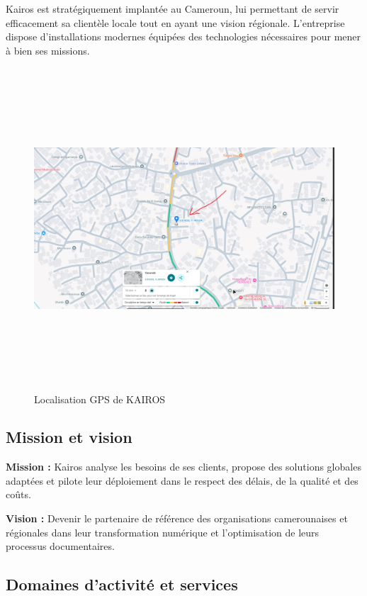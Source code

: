     Kairos est stratégiquement implantée au Cameroun, lui permettant de servir efficacement sa clientèle locale tout en ayant une vision régionale. L'entreprise dispose d'installations modernes équipées des technologies nécessaires pour mener à bien ses missions.
    
    \begin{figure}[H]
        \center
        \includegraphics[width=\textwidth, height=12cm]{Images/localisation.jpg}
        \caption{Localisation GPS de KAIROS}
    \end{figure}
    
    \subsection{Mission et vision}
    
    \textbf{Mission :} Kairos analyse les besoins de ses clients, propose des solutions globales adaptées et pilote leur déploiement dans le respect des délais, de la qualité et des coûts.
    
    \textbf{Vision :} Devenir le partenaire de référence des organisations camerounaises et régionales dans leur transformation numérique et l'optimisation de leurs processus documentaires.
    
    \subsection{Domaines d'activité et services}
    
